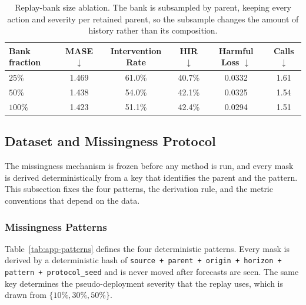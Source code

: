 \documentclass{article}
\begin{document}
\begin{table}[h]
  \caption{Replay-bank size ablation. The bank is subsampled by parent, keeping
  every action and severity per retained parent, so the subsample changes the amount of
  history rather than its composition.}
  \label{tab:app-replaysize}
  \centering
  \small
  \setlength{\tabcolsep}{4pt}
  \begin{tabular}{lccccc}
    \toprule
    Bank fraction & MASE $\downarrow$ & Intervention Rate & HIR $\downarrow$ & Harmful Loss $\downarrow$ & Calls $\downarrow$ \\
    \midrule
    $25\%$  & 1.469  & 61.0\%  & 40.7\%  & 0.0332  & 1.61 \\
    $50\%$  & 1.438  & 54.0\%  & 42.1\%  & 0.0325  & 1.54 \\
    $100\%$ & 1.423 & 51.1\% & 42.4\% & 0.0294 & 1.51 \\
    \bottomrule
  \end{tabular}
\end{table}

\subsection{Dataset and Missingness Protocol}
\label{app:data-protocol}
The missingness mechanism is frozen before any method is run, and every mask is derived
deterministically from a key that identifies the parent and the pattern. This subsection fixes
the four patterns, the derivation rule, and the metric conventions that depend on the data.

\subsubsection{Missingness Patterns}
\label{app:patterns}
Table~\ref{tab:app-patterns} defines the four deterministic patterns. Every mask is derived
by a deterministic hash of
\texttt{source + parent + origin + horizon + pattern + protocol\_seed} and is never moved
after forecasts are seen. The same key determines the pseudo-deployment severity that the
replay uses, which is drawn from $\{10\%, 30\%, 50\%\}$.
\end{document}
